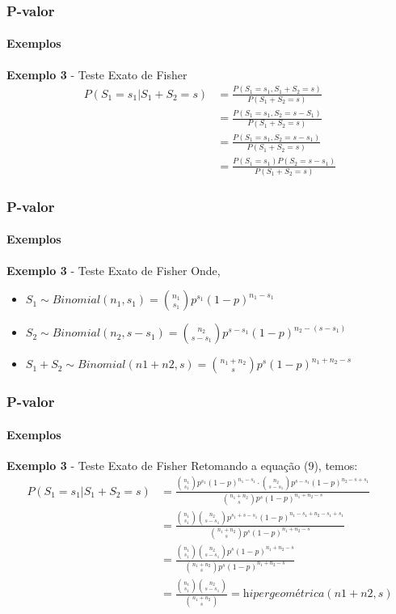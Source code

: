\begin{frame}[c]
\frametitle{P-valor} 
\framesubtitle{Exemplos}
\begin{exampleblock}{\textbf{Exemplo 3} - Teste Exato de Fisher} %
\begin{align}
    P(S_1=s_1|S_1+S_2=s)&=\frac{P(S_1=s_1,S_1+S_2=s)}{P(S_1+S_2=s)}\nonumber\\
              &=\frac{P(S_1=s_1,S_2=s-S_1)}{P(S_1+S_2=s)}\nonumber\\ 
              &=\frac{P(S_1=s_1,S_2=s-s_1)}{P(S_1+S_2=s)} \nonumber \\
              &=\frac{P(S_1=s_1)P(S_2=s-s_1)}{P(S_1+S_2=s)}
\end{align}
\end{exampleblock}
\end{frame}

\begin{frame}[c]
\frametitle{P-valor} 
\framesubtitle{Exemplos}
\begin{exampleblock}{\textbf{Exemplo 3} - Teste Exato de Fisher} %
Onde, 
    \begin{itemize}
        \item $S_1 \sim Binomial(n_1,s_1)=\binom{n_1}{s_1}p^{s_1}(1-p)^{n_1-s_1}$ 
        \item $S_2 \sim Binomial(n_2,s-s_1)=\binom{n_2}{s-s_1}p^{s-s_1}(1-p)^{n_2-(s-s_1)}$
        \item $S_1 + S_2 \sim Binomial(n1+n2,s)=\binom{n_1+n_2}{s}p^{s}(1-p)^{n_1+n_2-s}$
    \end{itemize}
\end{exampleblock}
\end{frame}

\begin{frame}[c]
\frametitle{P-valor} 
\framesubtitle{Exemplos}
\begin{exampleblock}{\textbf{Exemplo 3} - Teste Exato de Fisher} %
Retomando a equação (9), temos:
 \begin{align*}
    P(S_1=s_1|S_1+S_2=s)
    &=\frac{\binom{n_1}{s_1}p^{s_1}(1-p)^{n_1-s_1}\cdot\binom{n_2}{s-s_1}p^{s-s_1}(1-p)^{n_2-s+s_1}}{\binom{n_1+n_2}{s}p^{s}(1-p)^{n_1+n_2-s}}\\
    &=\frac{\binom{n_1}{s_1}\binom{n_2}{s-s_1}p^{s_1+s-s_1}(1-p)^{n_1-s_1+n_2-s_1+s_1}}{\binom{n_1+n_2}{s}p^{s}(1-p)^{n_1+n_2-s}}\\
    &=\frac{\binom{n_1}{s_1}\binom{n_2}{s-s_1}p^{s}(1-p)^{n_1+n_2-s}}{\binom{n_1+n_2}{s}p^{s}(1-p)^{n_1+n_2-s}}\\
    &=\frac{\binom{n_1}{s_1}\binom{n_2}{s-s_1}}{\binom{n_1+n_2}{s}}=\textit{hipergeométrica}(n1+n2,s)
\end{align*}
\end{exampleblock}
\end{frame}

